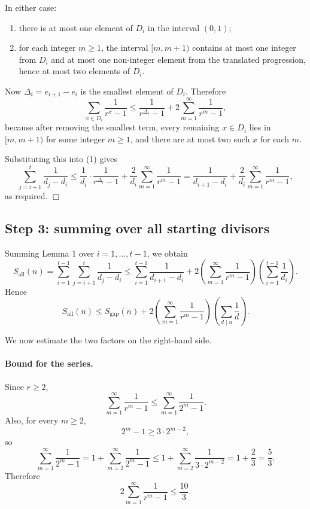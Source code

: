 In either case:

\begin{enumerate}
\item there is at most one element of \(D_i\) in the interval \((0,1)\);
\item for each integer \(m\geq 1\), the interval \([m,m+1)\) contains at most one integer from \(D_i\) and at most one non-integer element from the translated progression, hence at most two elements of \(D_i\).
\end{enumerate}

Now \(\Delta_i=e_{i+1}-e_i\) is the smallest element of \(D_i\). Therefore
\[
\sum_{x\in D_i}\frac{1}{r^x-1}
\leq
\frac{1}{r^{\Delta_i}-1}
+
2\sum_{m=1}^{\infty}\frac{1}{r^m-1},
\]
because after removing the smallest term, every remaining \(x\in D_i\) lies in \([m,m+1)\) for some integer \(m\geq 1\), and there are at most two such \(x\) for each \(m\).

Substituting this into (1) gives
\[
\sum_{j=i+1}^{t}\frac{1}{d_j-d_i}
\leq
\frac{1}{d_i}\cdot \frac{1}{r^{\Delta_i}-1}
+
\frac{2}{d_i}\sum_{m=1}^{\infty}\frac{1}{r^m-1}
=
\frac{1}{d_{i+1}-d_i}
+
\frac{2}{d_i}\sum_{m=1}^{\infty}\frac{1}{r^m-1},
\]
as required.
\qquad \(\Box\)

\subsection*{Step 3: summing over all starting divisors}

Summing Lemma 1 over \(i=1,\dots,t-1\), we obtain
\[
S_{\mathrm{all}}(n)
=
\sum_{i=1}^{t-1}\sum_{j=i+1}^{t}\frac{1}{d_j-d_i}
\leq
\sum_{i=1}^{t-1}\frac{1}{d_{i+1}-d_i}
+
2\left(\sum_{m=1}^{\infty}\frac{1}{r^m-1}\right)\left(\sum_{i=1}^{t-1}\frac{1}{d_i}\right).
\]
Hence
\[
S_{\mathrm{all}}(n)
\leq
S_{\mathrm{gap}}(n)
+
2\left(\sum_{m=1}^{\infty}\frac{1}{r^m-1}\right)\left(\sum_{d\mid n}\frac{1}{d}\right).
\tag{2}
\]

We now estimate the two factors on the right-hand side.

\paragraph{Bound for the series.}
Since \(r\geq 2\),
\[
\sum_{m=1}^{\infty}\frac{1}{r^m-1}
\leq
\sum_{m=1}^{\infty}\frac{1}{2^m-1}.
\]
Also, for every \(m\geq 2\),
\[
2^m-1 \geq 3\cdot 2^{m-2},
\]
so
\[
\sum_{m=1}^{\infty}\frac{1}{2^m-1}
=
1+\sum_{m=2}^{\infty}\frac{1}{2^m-1}
\leq
1+\sum_{m=2}^{\infty}\frac{1}{3\cdot 2^{m-2}}
=
1+\frac{2}{3}
=
\frac{5}{3}.
\]
Therefore
\[
2\sum_{m=1}^{\infty}\frac{1}{r^m-1}
\leq
\frac{10}{3}.
\tag{3}
\]

